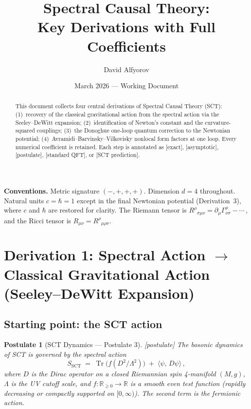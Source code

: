 \documentclass[12pt,a4paper]{article}
\title{\textbf{Spectral Causal Theory:\\[4pt]
       Key Derivations with Full Coefficients}}
\author{David Alfyorov}
\date{March 2026 --- Working Document}
\newtheorem{postulate}{Postulate}
\theoremstyle{definition}
\theoremstyle{remark}
\newcommand{\Tr}{\operatorname{Tr}}
\newcommand{\exact}{\textcolor{blue!70!black}{\textsf{[exact]}}}
\newcommand{\approxstep}{\textcolor{orange!80!black}{\textsf{[asymptotic]}}}
\newcommand{\postul}{\textcolor{red!70!black}{\textsf{[postulate]}}}
\newcommand{\stdqft}{\textcolor{teal!80!black}{\textsf{[standard QFT]}}}
\newcommand{\sctpred}{\textcolor{purple!80!black}{\textsf{[SCT prediction]}}}
\begin{document}
\maketitle

\begin{center}
\end{center}

\thispagestyle{empty}

\begin{abstract}
This document collects four central derivations of Spectral Causal
Theory (SCT): (1)~recovery of the classical gravitational action from the
spectral action via the Seeley--DeWitt expansion; (2)~identification of
Newton's constant and the curvature-squared couplings; (3)~the
Donoghue one-loop quantum correction to the Newtonian potential;
(4)~Avramidi--Barvinsky--Vilkovisky nonlocal form factors at one loop.
Every numerical coefficient is retained.  Each step is annotated as
\exact, \approxstep, \postul, \stdqft, or \sctpred.
\end{abstract}

\vspace{6pt}
\noindent\textbf{Conventions.}\;
Metric signature $(-,+,+,+)$.  Dimension $d=4$ throughout.
Natural units $c=\hbar=1$ except in the final Newtonian potential
(Derivation~3), where $c$ and $\hbar$ are restored for clarity.
The Riemann tensor is
$R^{\rho}{}_{\sigma\mu\nu}=\partial_\mu\Gamma^\rho_{\nu\sigma}-\cdots\,$,
and the Ricci tensor is
$R_{\mu\nu}=R^{\rho}{}_{\mu\rho\nu}$.
\medskip
\tableofcontents

\newpage
\section{Derivation 1: Spectral Action \texorpdfstring{$\to$}{to}
         Classical Gravitational Action\\
         (Seeley--DeWitt Expansion)}
\label{sec:spectral-to-classical}

\subsection{Starting point: the SCT action}

\begin{postulate}[SCT Dynamics --- Postulate 3]
\label{post:dynamics}
\postul\;
The bosonic dynamics of SCT is governed by the \emph{spectral action}
\begin{equation}
  \boxed{
  S_{\mathrm{SCT}}
  \;=\;
  \Tr\!\bigl(f(D^2/\Lambda^2)\bigr)
  \;+\;
  \langle\psi,\, D\psi\rangle
  }\,,
  \label{eq:SCT-action}
\end{equation}
where $D$ is the Dirac operator on a closed Riemannian spin 4-manifold
$(M,g)$, $\Lambda$ is the UV cutoff scale, and $f\colon\mathbb{R}_{\ge0}
\to\mathbb{R}$ is a smooth even test function (rapidly decreasing or
compactly supported on $[0,\infty)$).  The second term is the
fermionic action.
\end{postulate}
\end{document}
